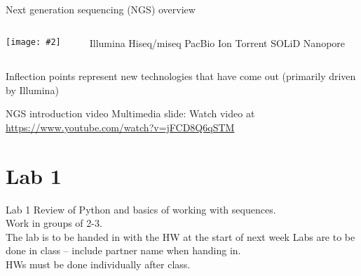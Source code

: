 \documentclass{beamer}
\renewcommand{\c}[1]{\begin{center}#1\end{center}}
\newcommand{\gr}[2][.95]{\c{\texttt{[image: \#2]}}}
\begin{document}
\begin{frame}{Next generation sequencing (NGS) overview}
\begin{columns}
\begin{column}{0.7\textwidth}
    \gr{l1_figs/s20_obligatory.png}
\end{column}
\begin{column}{0.3\textwidth}
    \begin{outline}
        \1 Illumina Hiseq/miseq
        \1 PacBio
        \1 Ion Torrent
        \1 SOLiD
        \1 Nanopore
    \end{outline}
\end{column}
\end{columns}
\medskip
Inflection points represent new technologies that have come out (primarily driven by Illumina)
\end{frame}

\begin{frame}{NGS introduction video}
Multimedia slide: Watch video at \url{https://www.youtube.com/watch?v=jFCD8Q6qSTM}
\end{frame}

\section{Lab 1}

\begin{frame}{Lab 1}
Review of Python and basics of working with sequences.\\
\bigskip
Work in groups of 2-3.\\
\bigskip
The lab is to be handed in with the HW at the start of next week
Labs are to be done in class – include partner name when handing in.\\
\bigskip
HWs must be done individually after class.
\end{frame}
\end{document}
